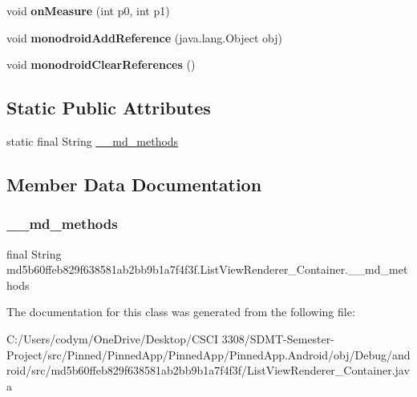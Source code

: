 \begin{DoxyCompactItemize}
void {\bfseries on\+Measure} (int p0, int p1)
\item 
\mbox{\label{classmd5b60ffeb829f638581ab2bb9b1a7f4f3f_1_1_list_view_renderer___container_ad6e3e1a3e209add1fbe6dcc4c6971ba7}} 
void {\bfseries monodroid\+Add\+Reference} (java.\+lang.\+Object obj)
\item 
\mbox{\label{classmd5b60ffeb829f638581ab2bb9b1a7f4f3f_1_1_list_view_renderer___container_ae29fb9368e6d471c74594d384760ab12}} 
void {\bfseries monodroid\+Clear\+References} ()
\end{DoxyCompactItemize}
\subsection*{Static Public Attributes}
\begin{DoxyCompactItemize}
\item 
static final String \hyperlink{classmd5b60ffeb829f638581ab2bb9b1a7f4f3f_1_1_list_view_renderer___container_ae024090a554fcbcab690e0e9f6bc8586}{\+\_\+\+\_\+md\+\_\+methods}
\end{DoxyCompactItemize}


\subsection{Member Data Documentation}
\mbox{\label{classmd5b60ffeb829f638581ab2bb9b1a7f4f3f_1_1_list_view_renderer___container_ae024090a554fcbcab690e0e9f6bc8586}} 
\subsubsection{\texorpdfstring{\+\_\+\+\_\+md\+\_\+methods}{\_\_md\_methods}}
{\footnotesize\ttfamily final String md5b60ffeb829f638581ab2bb9b1a7f4f3f.\+List\+View\+Renderer\+\_\+\+Container.\+\_\+\+\_\+md\+\_\+methods\hspace{0.3cm}{\ttfamily [static]}}



The documentation for this class was generated from the following file\+:\begin{DoxyCompactItemize}
\item 
C\+:/\+Users/codym/\+One\+Drive/\+Desktop/\+C\+S\+C\+I 3308/\+S\+D\+M\+T-\/\+Semester-\/\+Project/src/\+Pinned/\+Pinned\+App/\+Pinned\+App/\+Pinned\+App.\+Android/obj/\+Debug/android/src/md5b60ffeb829f638581ab2bb9b1a7f4f3f/List\+View\+Renderer\+\_\+\+Container.\+java\end{DoxyCompactItemize}
